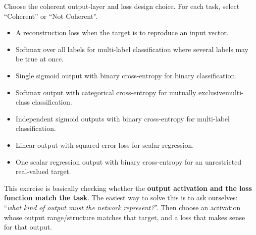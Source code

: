 \newpage

\noindent
\exercise[1.5] Choose the coherent output-layer and loss design choice. For each task, select ``Coherent'' or ``Not Coherent''.
\begin{itemize}
    \item A reconstruction loss when the target is to reproduce an input vector.
    \item Softmax over all labels for multi-label classification where several labels may be true at once.
    \item Single sigmoid output with binary cross-entropy for binary classification.
    \item Softmax output with categorical cross-entropy for mutually exclusive\break multi-class classification.
    \item Independent sigmoid outputs with binary cross-entropy for multi-label classification.
    \item Linear output with squared-error loss for scalar regression.
    \item One scalar regression output with binary cross-entropy for an unrestricted real-valued target.
\end{itemize}
\solution This exercise is basically checking whether the \textbf{output activation and the loss function match the task}. The easiest way to solve this is to ask ourselves: ``\emph{what kind of output must the network represent?}''. Then choose an activation whose output range/structure matches that target, and a loss that makes sense for that output.
